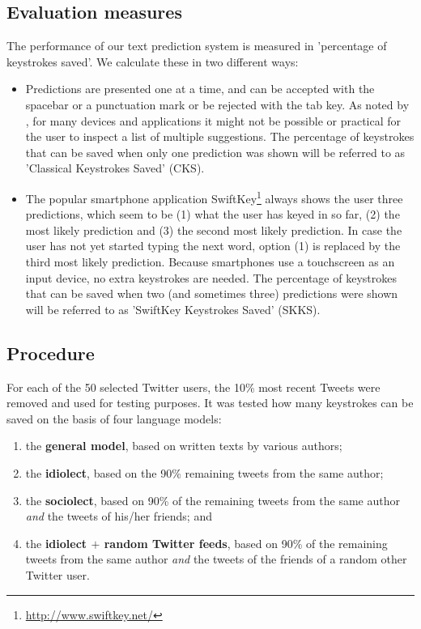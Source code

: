 \documentclass[11pt]{article}
\begin{document}
\subsection{Evaluation measures}
The performance of our text prediction system is measured in 'percentage of keystrokes saved'. We calculate these in two different ways:
\begin{itemize}
\item Predictions are presented one at a time, and can be accepted with the spacebar or a punctuation mark or be rejected with the tab key. As noted by , for many devices and applications it might not be possible or practical for the user to inspect a list of multiple suggestions. The percentage of keystrokes that can be saved when only one prediction was shown will be referred to as 'Classical Keystrokes Saved' (CKS).
\item The popular smartphone application SwiftKey\footnote{\url{http://www.swiftkey.net/}} always shows the user three predictions, which seem to be (1) what the user has keyed in so far, (2) the most likely prediction and (3) the second most likely prediction. In case the user has not yet started typing the next word, option (1) is replaced by the third most likely prediction. Because smartphones use a touchscreen as an input device, no extra keystrokes are needed. The percentage of keystrokes that can be saved when two (and sometimes three) predictions were shown will be referred to as 'SwiftKey Keystrokes Saved' (SKKS).
\end{itemize}

\subsection{Procedure}
For each of the 50 selected Twitter users, the 10\% most recent Tweets were removed and used for testing purposes. It was tested how many keystrokes can be saved on the basis of four language models:

\begin{enumerate}
\item the \textbf{general model}, based on written texts by various authors;
\item the \textbf{idiolect}, based on the 90\% remaining tweets from the same author;
\item the \textbf{sociolect}, based on 90\% of the remaining tweets from the same author \emph{and} the tweets of his/her friends; and
\item the \textbf{idiolect $+$ random Twitter feeds}, based on 90\% of the remaining tweets from the same author \emph{and} the tweets of the friends of a random other Twitter user.
\end{enumerate}
\end{document}
